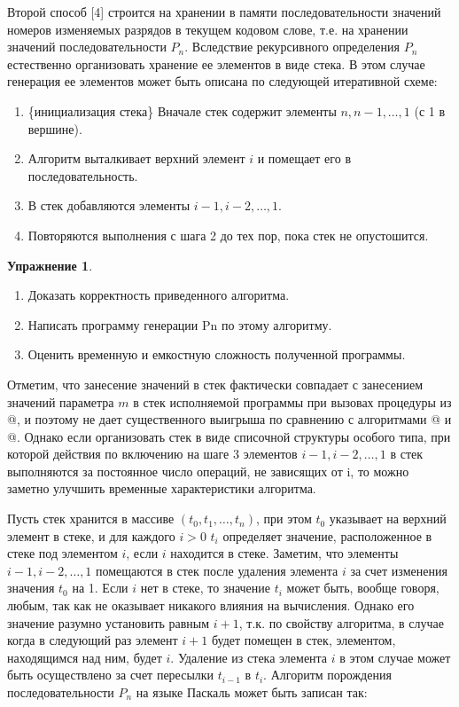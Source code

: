 \documentclass[12pt,a4paper]{article}
\theoremstyle{plain}
\theoremstyle{definition}
\newtheorem*{task}{Упражнение}
\theoremstyle{remark}
\begin{document}
Второй способ [4] строится на хранении в памяти последовательности значений номеров изменяемых разрядов в текущем кодовом слове, т.е. на хранении значений последовательности $P_n$. Вследствие рекурсивного определения $P_n$ естественно организовать хранение ее элементов в виде стека. В этом случае генерация ее элементов может быть описана по следующей итеративной схеме:

\begin{enumerate}
\item \{инициализация стека\} Вначале стек содержит элементы $n,n-1,\ldots,1$ (с 1 в вершине).
\item Алгоритм выталкивает верхний элемент $i$ и помещает его в последовательность.
\item В стек добавляются элементы $i-1,i-2,\ldots,1$.
\item Повторяются выполнения с шага 2 до тех пор, пока стек не опустошится.
\end{enumerate}

\begin{task}
~\\
\begin{enumerate}
\item Доказать корректность приведенного алгоритма.
\item Написать программу генерации Pn по этому алгоритму.
\item Оценить временную и емкостную сложность полученной программы.
\end{enumerate}
\end{task}

Отметим, что занесение значений в стек фактически совпадает с занесением значений параметра $m$ в стек исполняемой программы при вызовах процедуры \verb@GRAY@ из @, и поэтому не дает существенного выигрыша по сравнению с алгоритмами @ и @. Однако если организовать стек в виде списочной структуры особого типа, при которой действия по включению на шаге 3 элементов $i-1,i-2,\ldots,1$ в стек выполняются за постоянное число операций, не зависящих от i, то можно заметно улучшить временные характеристики алгоритма.

Пусть стек хранится в массиве $(t_0,t_1,\ldots,t_n)$, при этом $t_0$ указывает на верхний элемент в стеке, и для каждого $i>0$ $t_i$ определяет значение, расположенное в стеке под элементом $i$, если $i$ находится в стеке. Заметим, что элементы $i-1,i-2,\ldots,1$ помещаются в стек после удаления элемента $i$ за счет изменения значения $t_0$ на 1. Если $i$ нет в стеке, то значение $t_i$ может быть, вообще говоря, любым, так как не оказывает никакого влияния на вычисления. Однако его значение разумно установить равным $i+1$, т.к. по свойству алгоритма, в случае когда в следующий раз элемент $i+1$ будет помещен в стек, элементом, находящимся над ним, будет $i$. Удаление из стека элемента $i$ в этом случае может быть осуществлено за счет пересылки $t_{i-1}$ в $t_i$. Алгоритм порождения последовательности $P_n$ на языке Паскаль может быть записан так:
\end{document}
